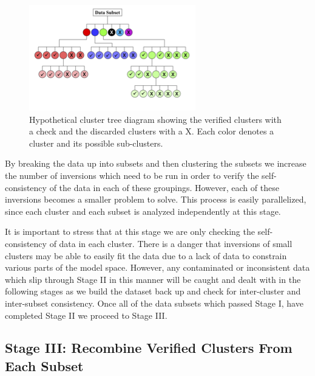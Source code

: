 \documentclass[final,authoryear,5p,times,twocolumn]{elsarticle}
\begin{document}
\begin{figure} [h!]
\begin{center}
   \includegraphics[trim=0cm 0cm 0cm 0cm, clip=true,width=0.75\linewidth]{./Figures/Fig14.png}
\end{center}
\caption{Hypothetical cluster tree diagram showing the verified clusters with a check and the discarded clusters with a X. Each color denotes a cluster and its possible sub-clusters.}
\label{fig:ClusterTree}
\end{figure}

By breaking the data up into subsets and then clustering the subsets we increase the number of inversions which need to be run in order to verify the self-consistency of the data in each of these groupings. However, each of these inversions becomes a smaller problem to solve. This process is easily parallelized, since each cluster and each subset is analyzed independently at this stage.

It is important to stress that at this stage we are only checking the self-consistency of data in each cluster. There is a danger that inversions of small clusters may be able to easily fit the data due to a lack of data to constrain various parts of the model space. However, any contaminated or inconsistent data which slip through Stage II in this manner will be caught and dealt with in the following stages as we build the dataset back up and check for inter-cluster and inter-subset consistency. Once all of the data subsets which passed Stage I, have completed Stage II we proceed to Stage III.

\subsection{Stage III: Recombine Verified Clusters From Each Subset}
\label{Data_Quality_Control:StageIII_Recombine_Clusters}
\end{document}
